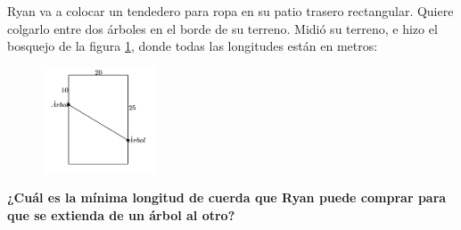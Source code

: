 Ryan va a colocar un tendedero para ropa en su patio trasero rectangular.
Quiere colgarlo entre dos árboles en el borde de su terreno.
Midió su terreno, e hizo el bosquejo de la figura \ref{fig:des_pitagoras_05}, donde todas las longitudes están en metros:
\begin{figure}[H]
    \begin{center}
        \includegraphics[width=0.3\textwidth]{../images/des_pitagoras_05.png}
    \end{center}
    \caption{}
    \label{fig:des_pitagoras_05}
\end{figure}

\textbf{¿Cuál es la mínima longitud de cuerda que Ryan puede comprar para que se extienda de un árbol al otro?}
